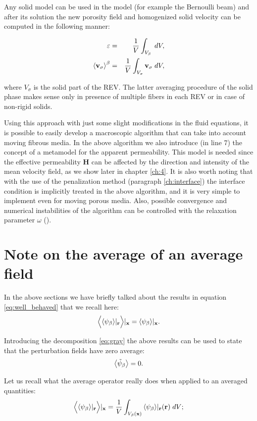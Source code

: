 \vspace{0.5cm}
Any solid model can be used in the model (for example the Bernoulli beam) and after its solution the new porosity field and homogenized solid velocity can be computed in the following manner:


\begin{eqnarray}
	\varepsilon &=& \dfrac{1}{V} \int_{V_\beta} \; dV,  \nonumber \\
{\left< \textbf{v}_{\sigma} \right>}^{\beta} &=& \dfrac{1}{V} \int_{V_{\sigma}} \textbf{v}_{\sigma} \; dV, \nonumber 
\end{eqnarray}

\noindent where $V_{\sigma}$ is the solid part of the REV.
The latter averaging procedure of the solid phase makes sense only in presence of multiple fibers in each REV or in case of non-rigid solids.

Using this approach with just some slight modifications in the fluid equations, it is possible to easily develop a macroscopic algorithm that can take into account moving fibrous media.
In the above algorithm we also introduce (in line 7) the concept of a metamodel for the apparent permeability. This model is needed since the effective permeability $\mathbf{H}$ can be affected by the direction and intensity of the mean velocity field, as we show later in chapter \ref{ch:4}.
It is also worth noting that with the use of the penalization method (paragraph \ref{ch:interface}) the interface condition is implicitly treated in the above algorithm, and it is very simple to implement even for moving porous media.
Also, possible convergence and numerical instabilities of the algorithm can be controlled with the relaxation parameter $\omega$ (\citet{irons1969aitken}).

\section{Note on the average of an average field}
\label{ch:appendix_a}

In the above sections we have briefly talked about the results in equation \eqref{eq:well_behaved} that we recall here:
$$\Big<{\left< \psi_{\beta} \right>}|_{\mathbf{r}} \Big>|_{\mathbf{x}} = {\left< \psi_{\beta} \right>}|_{\mathbf{x}}.$$

\noindent Introducing the decomposition \eqref{eq:gray} the above results can be used to state that the perturbation fields have zero average:
$$  {\left< \tilde{\psi}_{\beta} \right>} = 0.$$

\noindent Let us recall what the average operator really does when applied to an averaged quantities:
$$  \Big< {\left< \psi_{\beta} \right>}|_{\mathbf{r}} \Big>|_{\mathbf{x}}  = \dfrac{1}{V} \int_{V_\beta(\mathbf{x})} {\left< \psi_{\beta} \right>}|_{\mathbf{r}}(\mathbf{r}) \; dV; $$

